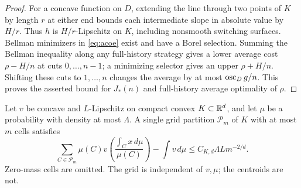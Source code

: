 \begin{proof}
For a concave function on $D$, extending the line through two points of $K$ by length $r$ at either end bounds each intermediate slope in absolute value by $H/r$. Thus $h$ is $H/r$-Lipschitz on $K$, including nonsmooth switching surfaces. Bellman minimizers in \eqref{eq:acoe} exist and have a Borel selection. Summing the Bellman inequality along any full-history strategy gives a lower average cost $\rho-H/n$ at cuts $0,\ldots,n-1$; a minimizing selector gives an upper $\rho+H/n$. Shifting these cuts to $1,\ldots,n$ changes the average by at most $\operatorname{osc}_Dg/n$. This proves the asserted bound for $J_*(n)$ and full-history average optimality of $\rho$.
\end{proof}

\begin{lemma}\label{lem:curvature}
Let $v$ be concave and $L$-Lipschitz on compact convex $K\subset\mathbb R^d$, and let $\mu$ be a probability with density at most $\Lambda$. A single grid partition $\mathcal P_m$ of $K$ with at most $m$ cells satisfies
\begin{equation}\label{eq:curvature}
 \sum_{C\in\mathcal P_m}\mu(C)v\left(\frac{\int_Cx\,d\mu}{\mu(C)}\right)
       -\int v\,d\mu\le C_{K,d}\Lambda Lm^{-2/d}.
\end{equation}
Zero-mass cells are omitted. The grid is independent of $v,\mu$; the centroids are not.
\end{lemma}
